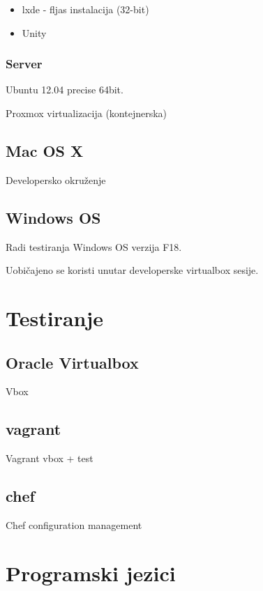 \documentclass[times, utf8, seminar]{fit}
\begin{document}
\begin{itemize}
  \item lxde - fljas instalacija (32-bit)
  \item Unity
\end{itemize}

\subsection{Server}

Ubuntu 12.04 precise 64bit.

Proxmox virtualizacija (kontejnerska)

\section{Mac OS X}

Developersko okruženje

\section{Windows OS}

Radi testiranja Windows OS verzija F18.

Uobičajeno se koristi unutar developerske virtualbox sesije.

\chapter{Testiranje}

\section{Oracle Virtualbox}

Vbox

\section{vagrant}

Vagrant vbox + test

\section{chef}

Chef configuration management

\chapter{Programski jezici}
\end{document}
